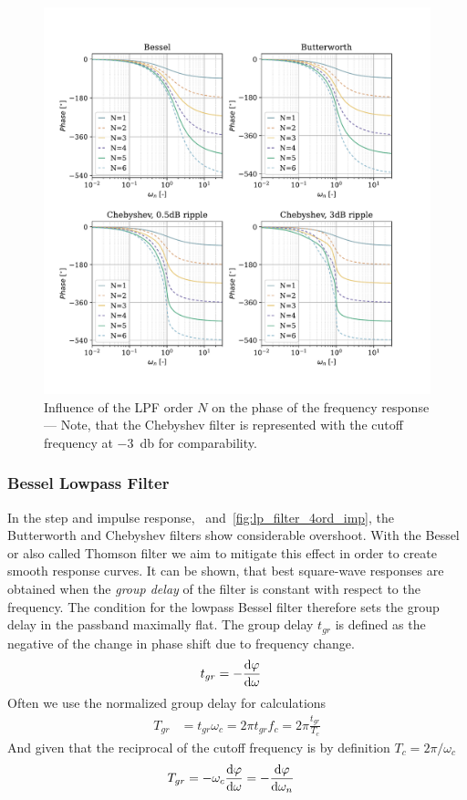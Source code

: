 \begin{figure}[!htb]
  \centering
  \includegraphics[scale=0.72]{figures/electronics/lowpass/lp_filter_pha}
  \caption[Influence of the \ac{LPF} order $N$ on the  phase of the frequency response]{Influence of the \ac{LPF} order $N$ on the  phase of the frequency response --- Note, that the Chebyshev filter is represented with the cutoff frequency at \SI{-3}{\decibel} for comparability.%
    \label{fig:lp_filter_pha}}
\end{figure}

\subsubsection{Bessel Lowpass Filter}
In the step and impulse response, ~and~\ref{fig:lp_filter_4ord_imp}, the Butterworth and Chebyshev filters show considerable overshoot. With the Bessel or also called Thomson filter we aim to mitigate this effect in order to create smooth response curves. It can be shown, that best square-wave responses are obtained when the \emph{group delay} of the filter is constant with respect to the frequency. The condition for the lowpass Bessel filter therefore sets the group delay in the passband maximally flat. The group delay $t_{gr}$ is defined as the negative of the change in phase shift due to frequency change.
\begin{align}
  t_{gr} &= -\dv{\varphi}{\omega}
\end{align}
Often we use the normalized group delay for calculations
\begin{align}
  T_{gr} &= t_{gr}\omega_c = 2\pi t_{gr}f_c = 2\pi\frac{t_{gr}}{T_c}
\end{align}
And given that the reciprocal of the cutoff frequency is by definition $T_c=2\pi/\omega_c$
\begin{align}
  T_{gr} &= -\omega_c\dv{\varphi}{\omega} = -\dv{\varphi}{\omega_n}
\end{align}

